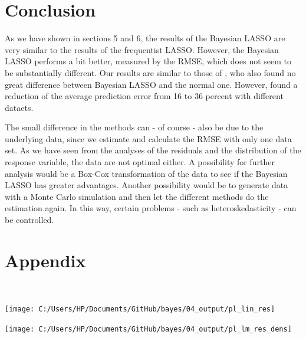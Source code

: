 \documentclass[12pt,a4paper]{article}
\let\origfigure\figure
\let\endorigfigure\endfigure
\renewenvironment{figure}[1][2] {
    \expandafter\origfigure\expandafter[H]
} {
    \endorigfigure
}
\begin{document}
\newpage

\hypertarget{conclusion}{%
\section{Conclusion}\label{conclusion}}

As we have shown in sections 5 and 6, the results of the Bayesian
\ac{LASSO} are very similar to the results of the frequentist
\ac{LASSO}. However, the Bayesian \ac{LASSO} performs a bit better,
measured by the \ac{RMSE}, which does not seem to be substantially
different. Our results are similar to those of
\textcite{park_bayesian_2008}, who also found no great difference
between Bayesian LASSO and the normal one. However,
\textcite{hans_bayesian_2009} found a reduction of the average
prediction error from 16 to 36 percent with different dataets.

The small difference in the methods can - of course - also be due to the
underlying data, since we estimate and calculate the RMSE with only one
data set. As we have seen from the analyses of the residuals and the
distribution of the response variable, the data are not optimal either.
A possibility for further analysis would be a Box-Cox transformation of
the data to see if the Bayesian LASSO has greater advantages. Another
possibility would be to generate data with a Monte Carlo simulation and
then let the different methods do the estimation again. In this way,
certain problems - such as heteroskedasticity - can be controlled.

\newpage

\hypertarget{appendix}{%
\section{Appendix}\label{appendix}}

\(\quad\)

\begin{figure}

\texttt{[image: C:/Users/HP/Documents/GitHub/bayes/04\_output/pl\_lin\_res]} \hfill{}

\caption{ \label{fig:res_lm} Plot of the Residuals vs Fitted Values for the Linear Model}\label{fig:fig3}
\end{figure}

\begin{figure}

\texttt{[image: C:/Users/HP/Documents/GitHub/bayes/04\_output/pl\_lm\_res\_dens]} \hfill{}

\caption{ \label{fig:res_lm_dens} Density Plot of the Residuals of the Linear Model}\label{fig:fig3_dens}
\end{figure}
\end{document}
